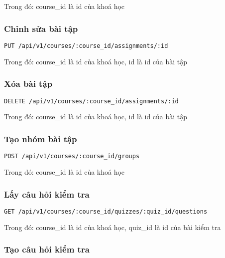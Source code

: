 \documentclass[../Thesis.tex]{subfiles}
\begin{document}
            Trong đó: course\_id là id của khoá học

            \subsubsection{Chỉnh sửa bài tập}
            \begin{lstlisting}[language=bash]
                PUT /api/v1/courses/:course_id/assignments/:id
            \end{lstlisting}

            Trong đó: course\_id là id của khoá học, id là id của bài tập

            \subsubsection{Xóa bài tập}

            \begin{lstlisting}[language=bash]
                DELETE /api/v1/courses/:course_id/assignments/:id
            \end{lstlisting}

            Trong đó: course\_id là id của khoá học, id là id của bài tập

            \subsubsection{Tạo nhóm bài tập}
            \begin{lstlisting}[language=bash]
                POST /api/v1/courses/:course_id/groups
            \end{lstlisting}

            Trong đó: course\_id là id của khoá học
            
            \subsubsection{Lấy câu hỏi kiểm tra}
            \begin{lstlisting}[language=bash]
                GET /api/v1/courses/:course_id/quizzes/:quiz_id/questions
            \end{lstlisting}

            Trong đó: course\_id là id của khoá học, quiz\_id là id của bài kiểm tra

            \subsubsection{Tạo câu hỏi kiểm tra}
\end{document}
